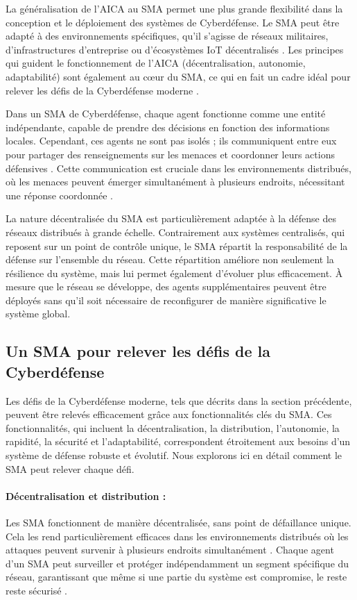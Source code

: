 La généralisation de l'AICA au SMA permet une plus grande flexibilité dans la conception et le déploiement des systèmes de Cyberdéfense. Le SMA peut être adapté à des environnements spécifiques, qu'il s'agisse de réseaux militaires, d'infrastructures d'entreprise ou d'écosystèmes IoT décentralisés \cite{kott2023autonomous}. Les principes qui guident le fonctionnement de l'AICA (décentralisation, autonomie, adaptabilité) sont également au cœur du SMA, ce qui en fait un cadre idéal pour relever les défis de la Cyberdéfense moderne \cite{kolias2011swarm}.

Dans un SMA de Cyberdéfense, chaque agent fonctionne comme une entité indépendante, capable de prendre des décisions en fonction des informations locales. Cependant, ces agents ne sont pas isolés ; ils communiquent entre eux pour partager des renseignements sur les menaces et coordonner leurs actions défensives \cite{kolias2011swarm}. Cette communication est cruciale dans les environnements distribués, où les menaces peuvent émerger simultanément à plusieurs endroits, nécessitant une réponse coordonnée \cite{bace2001intrusion}.

La nature décentralisée du SMA est particulièrement adaptée à la défense des réseaux distribués à grande échelle. Contrairement aux systèmes centralisés, qui reposent sur un point de contrôle unique, le SMA répartit la responsabilité de la défense sur l'ensemble du réseau. Cette répartition améliore non seulement la résilience du système, mais lui permet également d'évoluer plus efficacement. À mesure que le réseau se développe, des agents supplémentaires peuvent être déployés sans qu'il soit nécessaire de reconfigurer de manière significative le système global.

\subsection{Un SMA pour relever les défis de la Cyberdéfense}

Les défis de la Cyberdéfense moderne, tels que décrits dans la section précédente, peuvent être relevés efficacement grâce aux fonctionnalités clés du SMA. Ces fonctionnalités, qui incluent la décentralisation, la distribution, l'autonomie, la rapidité, la sécurité et l'adaptabilité, correspondent étroitement aux besoins d'un système de défense robuste et évolutif. Nous explorons ici en détail comment le SMA peut relever chaque défi.

\paragraph{Décentralisation et distribution :}
Les SMA fonctionnent de manière décentralisée, sans point de défaillance unique. Cela les rend particulièrement efficaces dans les environnements distribués où les attaques peuvent survenir à plusieurs endroits simultanément \cite{kolias2011swarm}. Chaque agent d'un SMA peut surveiller et protéger indépendamment un segment spécifique du réseau, garantissant que même si une partie du système est compromise, le reste reste sécurisé \cite{shakarian2015cyber}.

